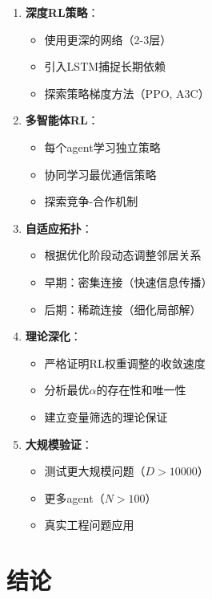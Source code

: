 \documentclass[15pt,a3paper]{ctexart}
\begin{document}
\begin{enumerate}
    \item \textbf{深度RL策略}：
    \begin{itemize}
        \item 使用更深的网络（2-3层）
        \item 引入LSTM捕捉长期依赖
        \item 探索策略梯度方法（PPO, A3C）
    \end{itemize}
    
    \item \textbf{多智能体RL}：
    \begin{itemize}
        \item 每个agent学习独立策略
        \item 协同学习最优通信策略
        \item 探索竞争-合作机制
    \end{itemize}
    
    \item \textbf{自适应拓扑}：
    \begin{itemize}
        \item 根据优化阶段动态调整邻居关系
        \item 早期：密集连接（快速信息传播）
        \item 后期：稀疏连接（细化局部解）
    \end{itemize}
    
    \item \textbf{理论深化}：
    \begin{itemize}
        \item 严格证明RL权重调整的收敛速度
        \item 分析最优$\alpha$的存在性和唯一性
        \item 建立变量筛选的理论保证
    \end{itemize}
    
    \item \textbf{大规模验证}：
    \begin{itemize}
        \item 测试更大规模问题（$D > 10000$）
        \item 更多agent（$N > 100$）
        \item 真实工程问题应用
    \end{itemize}
\end{enumerate}

\section{结论}
\end{document}
